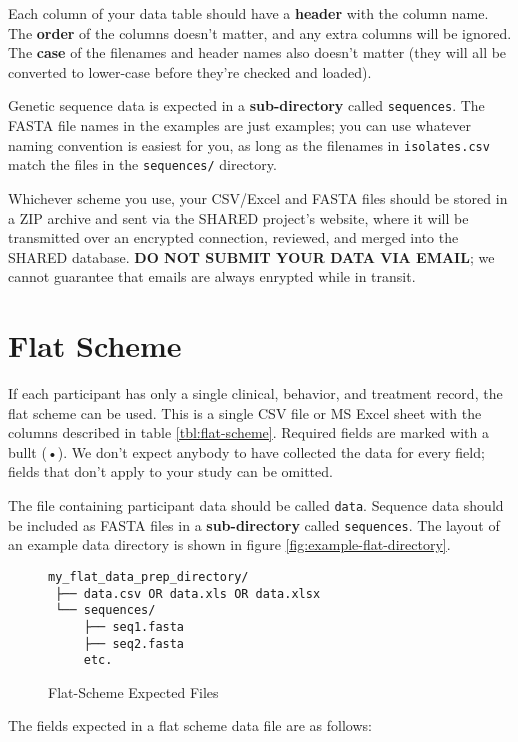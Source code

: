 \documentclass{article}
\begin{document}
Each column of your data table should have a \textbf{header} with the
column name. The \textbf{order} of the columns doesn't matter, and any
extra columns will be ignored. The \textbf{case} of the filenames and
header names also doesn't matter (they will all be converted to
lower-case before they're checked and loaded).

Genetic sequence data is expected in a \textbf{sub-directory} called
\texttt{sequences}. The FASTA file names in the examples are just
examples; you can use whatever naming convention is easiest for you,
as long as the filenames in \texttt{isolates.csv} match the files in
the \texttt{sequences/} directory.

Whichever scheme you use, your CSV/Excel and FASTA files should be
stored in a ZIP archive and sent via the SHARED project's website,
where it will be transmitted over an encrypted connection, reviewed,
and merged into the SHARED database. \textbf{DO NOT SUBMIT YOUR DATA
  VIA EMAIL}; we cannot guarantee that emails are always enrypted
while in transit.



\section{Flat Scheme}

If each participant has only a single clinical, behavior, and
treatment record, the flat scheme can be used. This is a single CSV
file or MS Excel sheet with the columns described in table
\ref{tbl:flat-scheme}. Required fields are marked with a bullt (•). We
don't expect anybody to have collected the data for every field;
fields that don't apply to your study can be omitted.

The file containing participant data should be called
\texttt{data}. Sequence data should be included as FASTA files in a
\textbf{sub-directory} called \texttt{sequences}. The layout of an
example data directory is shown in figure
\ref{fig:example-flat-directory}.

\begin{figure}
  \caption{Flat-Scheme Expected Files}
  \label{fig:flat-scheme-expected-files}
\begin{verbatim}
my_flat_data_prep_directory/
 ├── data.csv OR data.xls OR data.xlsx
 └── sequences/
     ├── seq1.fasta
     ├── seq2.fasta
     etc.
\end{verbatim}
\end{figure}

The fields expected in a flat scheme data file are as follows:
\end{document}
